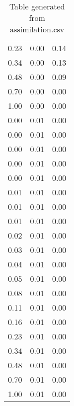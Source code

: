 \begin{table}[ht]
\begin{table}[ht]
\begin{tabular}{|ccc}
  0.23 & 0.00 & 0.14 \\ 
  0.34 & 0.00 & 0.13 \\ 
  0.48 & 0.00 & 0.09 \\ 
  0.70 & 0.00 & 0.00 \\ 
  1.00 & 0.00 & 0.00 \\ 
  0.00 & 0.01 & 0.00 \\ 
  0.00 & 0.01 & 0.00 \\ 
  0.00 & 0.01 & 0.00 \\ 
  0.00 & 0.01 & 0.00 \\ 
  0.00 & 0.01 & 0.00 \\ 
  0.01 & 0.01 & 0.00 \\ 
  0.01 & 0.01 & 0.00 \\ 
  0.01 & 0.01 & 0.00 \\ 
  0.02 & 0.01 & 0.00 \\ 
  0.03 & 0.01 & 0.00 \\ 
  0.04 & 0.01 & 0.00 \\ 
  0.05 & 0.01 & 0.00 \\ 
  0.08 & 0.01 & 0.00 \\ 
  0.11 & 0.01 & 0.00 \\ 
  0.16 & 0.01 & 0.00 \\ 
  0.23 & 0.01 & 0.00 \\ 
  0.34 & 0.01 & 0.00 \\ 
  0.48 & 0.01 & 0.00 \\ 
  0.70 & 0.01 & 0.00 \\ 
  1.00 & 0.01 & 0.00 \\ 
   \hline
\end{tabular}
\caption{Table generated from assimilation.csv} 
\end{table}
\end{table}
